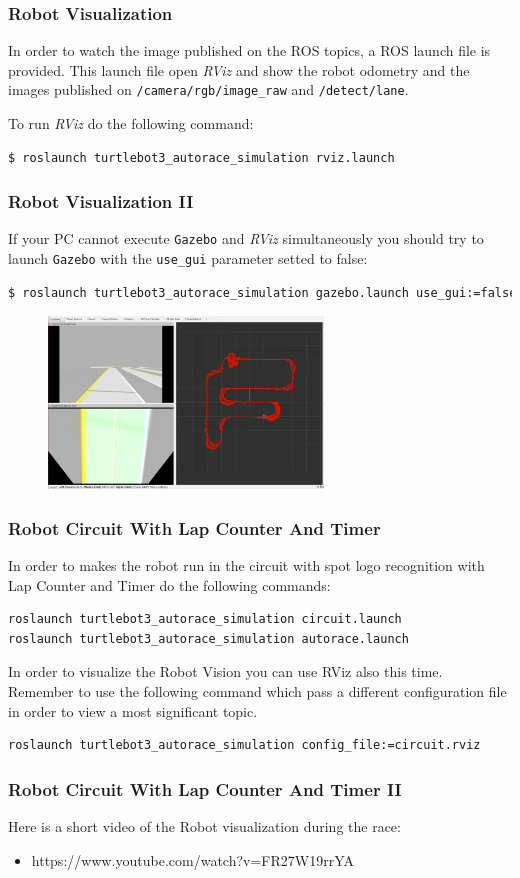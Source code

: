 \begin{frame}[fragile]
	\frametitle{Robot Visualization}
	In order to watch the image published on the ROS topics, a ROS launch file is provided. This launch file open \textit{RViz} and show the robot odometry and the images published on \texttt{/camera/rgb/image\_raw} and \texttt{/detect/lane}.
	
	To run \textit{RViz} do the following command:
\begin{lstlisting}
$ roslaunch turtlebot3_autorace_simulation rviz.launch
\end{lstlisting}
\end{frame}

\begin{frame}[fragile]
	\frametitle{Robot Visualization II}
	If your PC cannot execute \texttt{Gazebo} and \textit{RViz} simultaneously you should try to launch \texttt{Gazebo} with the \texttt{use\_gui} parameter setted to false:
\begin{lstlisting}[language=bash]
$ roslaunch turtlebot3_autorace_simulation gazebo.launch use_gui:=false
\end{lstlisting}
\begin{figure}
	\includegraphics[width=0.65\textwidth]{figures/png/rviz}
\end{figure}

\end{frame}

\begin{frame}[fragile]
	\frametitle{Robot Circuit With Lap Counter And Timer}
	In order to makes the robot run in the circuit with spot logo recognition with Lap Counter and Timer do the following commands:
\begin{lstlisting}[language=bash]
roslaunch turtlebot3_autorace_simulation circuit.launch
roslaunch turtlebot3_autorace_simulation autorace.launch
\end{lstlisting}
	In order to visualize the Robot Vision you can use RViz also this time.
	Remember to use the following command which pass a different configuration file in order to view a most significant topic.
\begin{lstlisting}[language=bash]
roslaunch turtlebot3_autorace_simulation config_file:=circuit.rviz	
\end{lstlisting}
\end{frame}

\begin{frame}
	\frametitle{Robot Circuit With Lap Counter And Timer II}
	Here is a short video of the Robot visualization during the race:
	\begin{itemize}
		\item https://www.youtube.com/watch?v=FR27W19rrYA
	\end{itemize}
	
	
	


\end{frame}
